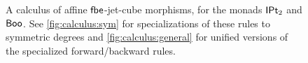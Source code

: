 \documentclass[a4paper]{memoir}
\begin{document}
\begin{figure}
	\caption{A calculus of affine ${\mathsf{fbe}}$-jet-cube morphisms, for the monads ${\mathsf{IPt}_2}$ and $\mathsf{Boo}$. See \cref{fig:calculus:sym} for specializations of these rules to symmetric degrees and \cref{fig:calculus:general} for unified versions of the specialized forward/backward rules.}
	\label{fig:calculus}
\end{figure}
\end{document}
